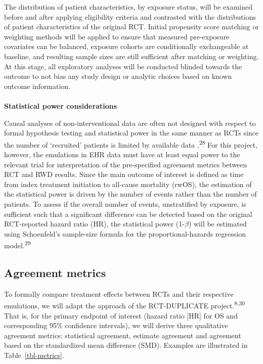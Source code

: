 \documentclass[
  letterpaper,
  DIV=11,
  numbers=noendperiod]{scrartcl}
\makeatletter
\let\oldparagraph\paragraph
\renewcommand{\paragraph}{
    \@ifstar
      \xxxParagraphStar
      \xxxParagraphNoStar
  }
\newcommand{\xxxParagraphStar}[1]{\oldparagraph*{#1}\mbox{}}
\newcommand{\xxxParagraphNoStar}[1]{\oldparagraph{#1}\mbox{}}
\makeatother
\begin{document}
The distribution of patient characteristics, by exposure status, will be
examined before and after applying eligibility criteria and contrasted
with the distributions of patient characteristics of the original RCT.
Initial propensity score matching or weighting methods will be applied
to ensure that measured pre-exposure covariates can be balanced,
exposure cohorts are conditionally exchangeable at baseline, and
resulting sample sizes are still sufficient after matching or weighting.
At this stage, all exploratory analyses will be conducted blinded
towards the outcome to not bias any study design or analytic choices
based on known outcome information.

\paragraph{\texorpdfstring{\textbf{Statistical power
considerations}}{Statistical power considerations}}\label{statistical-power-considerations}

Causal analyses of non-interventional data are often not designed with
respect to formal hypothesis testing and statistical power in the same
manner as RCTs since the number of `recruited' patients is limited by
available data .\textsuperscript{28} For this project, however, the
emulations in EHR data must have at least equal power to the relevant
trial for interpretation of the pre-specified agreement metrics between
RCT and RWD results. Since the main outcome of interest is defined as
time from index treatment initiation to all-cause mortality (rwOS), the
estimation of the statistical power is driven by the number of events
rather than the number of patients. To assess if the overall number of
events, unstratified by exposure, is sufficient such that a significant
difference can be detected based on the original RCT-reported hazard
ratio (HR), the statistical power (1-\(\beta\)) will be estimated using
Schoenfeld's sample-size formula for the proportional-hazards regression
model.\textsuperscript{29}

\subsection{Agreement metrics}\label{sec-agreement-metrics}

To formally compare treatment effects between RCTs and their respective
emulations, we will adapt the approach of the RCT-DUPLICATE
project.\textsuperscript{8,30} That is, for the primary endpoint of
interest (hazard ratio {[}HR{]} for OS and corresponding 95\% confidence
intervals), we will derive three qualitative agreement metrics:
statistical agreement, estimate agreement and agreement based on the
standardized mean difference (SMD). Examples are illustrated in
Table~\ref{tbl-metrics}.
\end{document}
